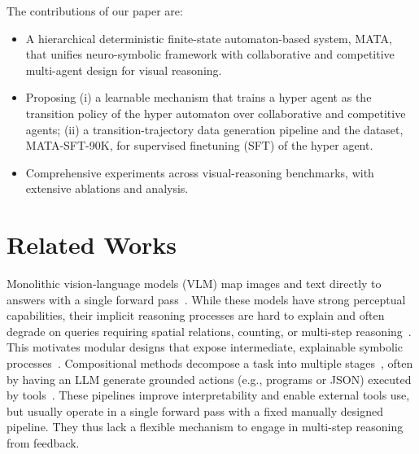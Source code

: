 \documentclass{article} %
\newcommand{\eg}{e.g.}
\newcommand{\methodname}{MATA}
\newcommand{\datasetname}{\methodname-SFT-90K}
\begin{document}
The contributions of our paper are:

\begin{itemize}[leftmargin=0.35cm]
    \item A hierarchical deterministic finite-state automaton-based system, \methodname{}, that unifies neuro-symbolic framework with collaborative and competitive multi-agent design for visual reasoning.
    \item Proposing (i) a learnable mechanism that trains a hyper agent as the transition policy of the hyper automaton over collaborative and competitive agents; (ii) a transition-trajectory data generation pipeline and the dataset, \datasetname{}, for supervised finetuning (SFT) of the hyper agent.
    \item Comprehensive experiments across visual-reasoning benchmarks, with extensive ablations and analysis.
\end{itemize}

\section{Related Works}

Monolithic vision-language models (VLM) map images and text directly to answers with a single forward pass~\citep{xiao_florence-2_2024, liu_grounding_2023, li_otter_2023, li_blip-2_2023, wu_next-gpt_2023, stanic_towards_2024, zhu_minigpt-4_2023}. While these models have strong perceptual capabilities, their implicit reasoning processes are hard to explain and often degrade on queries requiring spatial relations, counting, or multi-step reasoning~\citep{jahangard_jrdb-social_2024, jahangard_jrdb-reasoning_2025}. This motivates modular designs that expose intermediate, explainable symbolic processes~\citep{andreas_neural_2016, hsu_whats_2023}. Compositional methods decompose a task into multiple stages~\citep{ke_explain_2025}, often by having an LLM generate grounded actions (\eg, programs or JSON) executed by tools~\citep{gupta_visual_2023, suris_vipergpt_2023, shen_hugginggpt_2023, lu_chameleon_2023}. These pipelines improve interpretability and enable external tools use, but usually operate in a single forward pass with a fixed manually designed pipeline. They thus lack a flexible mechanism to engage in multi-step reasoning from feedback.
\end{document}
